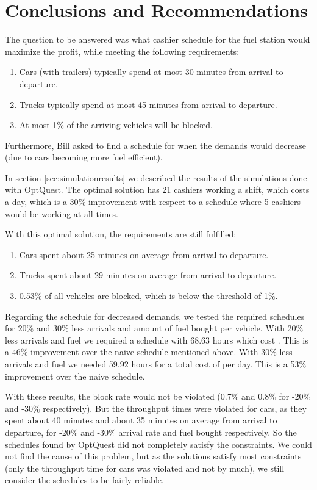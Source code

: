 \section{Conclusions and Recommendations}
The question to be answered was what cashier schedule for the fuel station would maximize the profit, while meeting the following requirements:
\begin{enumerate}
	\item Cars (with  trailers) typically spend at most 30 minutes from arrival to departure.
	\item Trucks typically spend at most 45 minutes from arrival to departure.
	\item At most 1$\%$ of the arriving vehicles will be blocked.
\end{enumerate}
Furthermore, Bill asked to find a schedule for when the demands would decrease (due to cars becoming more fuel efficient).

In section \ref{sec:simulationresults} we described the results of the simulations done with OptQuest. The optimal solution has 21 cashiers working a shift, which costs  a day, which is a 30$\%$ improvement with respect to a schedule where 5 cashiers would be working at all times.

With this optimal solution, the requirements are still fulfilled:
\begin{enumerate}
	\item Cars spent about 25 minutes on average from arrival to departure.
	\item Trucks spent about 29 minutes on average from arrival to departure.
	\item 0.53$\%$ of all vehicles are blocked, which is below the threshold of 1$\%$.
\end{enumerate}

Regarding the schedule for decreased demands, we tested the required schedules for 20$\%$ and 30$\%$ less arrivals and amount of fuel bought per vehicle. With 20$\%$ less arrivals and fuel we required a schedule with 68.63 hours which cost . This is a 46$\%$ improvement over the naive schedule mentioned above. With 30$\%$ less arrivals and fuel we needed 59.92 hours for a total cost of  per day. This is a 53$\%$ improvement over the naive schedule. 

With these results, the block rate would not be violated (0.7$\%$ and 0.8$\%$ for -20$\%$ and -30$\%$ respectively). But the throughput times were  violated for cars, as they spent about 40 minutes and about 35 minutes on average from arrival to departure, for -20$\%$ and -30$\%$ arrival rate and fuel bought respectively. So the schedules found by OptQuest did not completely satisfy the constraints. We could not find the cause of this problem, but as the solutions satisfy most constraints (only the throughput time for cars was violated and not by much), we still consider the schedules to be fairly reliable.

